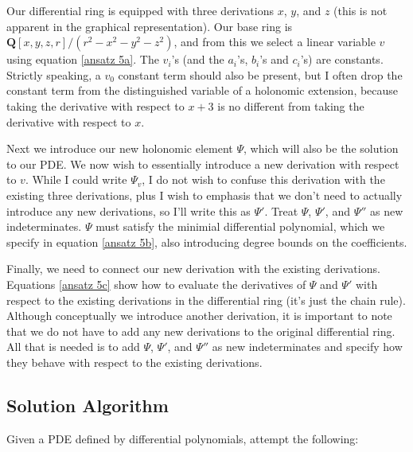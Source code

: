 \documentclass{article}
\begin{document}
Our differential ring is equipped with three derivations $x$, $y$, and $z$
(this is not apparent in the graphical representation).  Our base ring
is $\mathbf{Q}[x,y,z,r]/(r^2-x^2-y^2-z^2)$, and from this we select
a linear variable $v$ using equation \eqref{ansatz 5a}.
The $v_i$'s (and the $a_i$'s, $b_i$'s and $c_i$'s) are constants.
Strictly speaking, a $v_0$ constant term
should also be present, but I often drop the constant term from the
distinguished variable of a holonomic extension, because taking
the derivative with respect to $x+3$ is no different from taking
the derivative with respect to $x$.

Next we introduce our new holonomic element $\Psi$, which will
also be the solution to our PDE.
We now wish to essentially introduce a new derivation with respect to $v$.
While I could write $\Psi_v$, I do not wish to confuse this derivation
with the existing three derivations, plus I wish to emphasis
that we don't need to actually introduce any new derivations,
so I'll write this as $\Psi'$.  Treat $\Psi$, $\Psi'$, and
$\Psi''$ as new indeterminates.
$\Psi$ must satisfy the minimial differential polynomial, which
we specify in equation \eqref{ansatz 5b}, also introducing
degree bounds on the coefficients.

Finally, we need to connect our new derivation with the existing derivations.
Equations \eqref{ansatz 5c} show how to evaluate
the derivatives of $\Psi$ and $\Psi'$ with respect to the
existing derivations in the differential ring (it's just the chain rule).
Although conceptually we introduce another derivation, it is important
to note that we do not have to add any new derivations to the original differential ring.
All that is needed is
to add $\Psi$, $\Psi'$, and $\Psi''$ as new indeterminates
and specify how they behave with respect to the existing derivations.

\subsection*{Solution Algorithm}

Given a PDE defined by differential polynomials, attempt the following:
\end{document}
